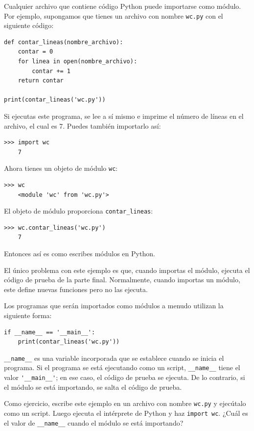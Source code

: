 \documentclass[10pt]{book}
\begin{document}
Cualquier archivo que contiene código Python puede importarse como módulo.
Por ejemplo, supongamos que tienes un archivo con nombre {\tt wc.py} con el siguiente
código:

\begin{verbatim}
def contar_lineas(nombre_archivo):
    contar = 0
    for linea in open(nombre_archivo):
        contar += 1
    return contar

print(contar_lineas('wc.py'))
\end{verbatim}
%
Si ejecutas este programa, se lee a sí mismo e imprime el número
de líneas en el archivo, el cual es 7.
Puedes también importarlo así:

\begin{verbatim}
>>> import wc
    7
\end{verbatim}
%
Ahora tienes un objeto de módulo {\tt wc}:

\begin{verbatim}
>>> wc
    <module 'wc' from 'wc.py'>
\end{verbatim}
%
El objeto de módulo proporciona \verb"contar_lineas":

\begin{verbatim}
>>> wc.contar_lineas('wc.py')
    7
\end{verbatim}
%
Entonces así es como escribes módulos en Python.

El único problema con este ejemplo es que, cuando importas
el módulo, ejecuta el código de prueba de la parte final.  Normalmente,
cuando importas un módulo, este define nuevas funciones pero
no las ejecuta.

Los programas que serán importados como módulos a menudo
utilizan la siguiente forma:

\begin{verbatim}
if __name__ == '__main__':
    print(contar_lineas('wc.py'))
\end{verbatim}
%
\verb"__name__" es una variable incorporada que se establece cuando
se inicia el programa.  Si el programa se está ejecutando como un script,
\verb"__name__" tiene el valor \verb"'__main__'"; en ese
caso, el código de prueba se ejecuta.  De lo contrario,
si el módulo se está importando, se salta el código de prueba.


Como ejercicio, escribe este ejemplo en un archivo con nombre {\tt wc.py} y ejecútalo
como un script.  Luego ejecuta el intérprete de Python y
haz {\tt import wc}.  ¿Cuál es el valor de \verb"__name__"
cuando el módulo se está importando?
\end{document}
